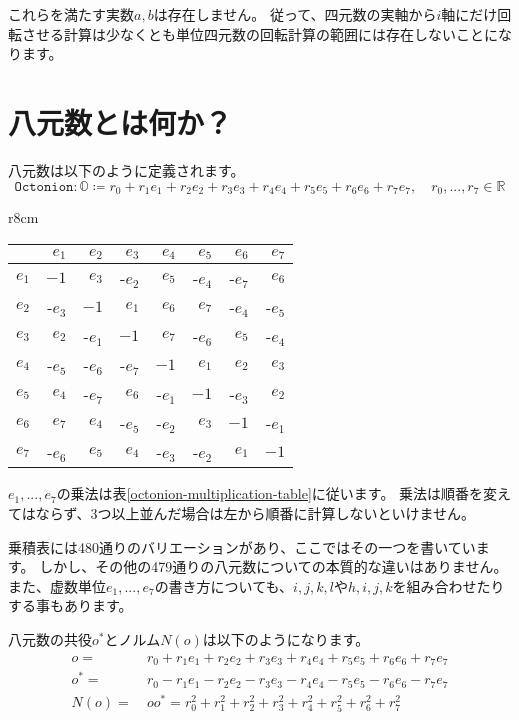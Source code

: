 \documentclass[a4paper,12pt]{jsreport}
\begin{document}
これらを満たす実数$a,b$は存在しません。
従って、四元数の実軸から$i$軸にだけ回転させる計算は少なくとも単位四元数の回転計算の範囲には存在しないことになります。

\section{八元数とは何か？}

八元数は以下のように定義されます。
\begin{equation}
\texttt{Octonion}:\mathbb{O}\coloneq r_0+r_1e_1+r_2e_2+r_3e_3+r_4e_4+r_5e_5+r_6e_6+r_7e_7,
\quad r_0,...,r_7\in\mathbb{R}
\end{equation}

\begin{wraptable}{r}{8cm}
\caption{乗積表\label{octonion-multiplication-table}}
\centering
\begin{tabular}{rrrrrrrr}\hline
     & $e_1$& $e_2$& $e_3$& $e_4$& $e_5$& $e_6$& $e_7$\\\hline
$e_1$& $ -1$& $e_3$&-$e_2$& $e_5$&-$e_4$&-$e_7$& $e_6$\\\hline
$e_2$&-$e_3$& $ -1$& $e_1$& $e_6$& $e_7$&-$e_4$&-$e_5$\\\hline
$e_3$& $e_2$&-$e_1$& $ -1$& $e_7$&-$e_6$& $e_5$&-$e_4$\\\hline
$e_4$&-$e_5$&-$e_6$&-$e_7$& $ -1$& $e_1$& $e_2$& $e_3$\\\hline
$e_5$& $e_4$&-$e_7$& $e_6$&-$e_1$& $ -1$&-$e_3$& $e_2$\\\hline
$e_6$& $e_7$& $e_4$&-$e_5$&-$e_2$& $e_3$& $ -1$&-$e_1$\\\hline
$e_7$&-$e_6$& $e_5$& $e_4$&-$e_3$&-$e_2$& $e_1$& $ -1$\\\hline
\end{tabular}
\end{wraptable}

$e_1,...,e_7$の乗法は表\ref{octonion-multiplication-table}に従います。
乗法は順番を変えてはならず、3つ以上並んだ場合は左から順番に計算しないといけません。

乗積表には480通りのバリエーションがあり、ここではその一つを書いています。
しかし、その他の479通りの八元数についての本質的な違いはありません。
また、虚数単位$e_1,...,e_7$の書き方についても、$i,j,k,l$や$h,i,j,k$を組み合わせたりする事もあります。

八元数の共役$o^*$とノルム$N(o)$は以下のようになります。
\begin{equation}
\begin{split}
o=~&r_0+r_1e_1+r_2e_2+r_3e_3+r_4e_4+r_5e_5+r_6e_6+r_7e_7\\
o^*=~&r_0-r_1e_1-r_2e_2-r_3e_3-r_4e_4-r_5e_5-r_6e_6-r_7e_7\\
N(o)=~&oo^*=r_0^2+r_1^2+r_2^2+r_3^2+r_4^2+r_5^2+r_6^2+r_7^2
\end{split}
\end{equation}
\end{document}
